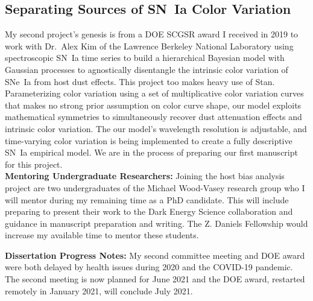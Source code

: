 \documentclass[modern]{aastex63}
\begin{document}
\subsection{Separating Sources of SN~Ia Color Variation}
My second project's genesis is from a DOE SCGSR award I received in 2019 to work with Dr.~Alex Kim of the Lawrence Berkeley National Laboratory using spectroscopic SN~Ia time series to build a hierarchical Bayesian model with Gaussian processes to agnostically disentangle the intrinsic color variation of SNe~Ia from host dust effects.
This project too makes heavy use of Stan.
Parameterizing color variation using a set of multiplicative color variation curves that makes no strong prior assumption on color curve shape, our model exploits mathematical symmetries to simultaneously recover dust attenuation effects and intrinsic color variation.
The our model's wavelength resolution is adjustable, and time-varying color variation is being implemented to create a fully descriptive SN~Ia empirical model.
We are in the process of preparing our first manuscript for this project.\\

{\bf Mentoring Undergraduate Researchers:}
Joining the host bias analysis project are two undergraduates of the Michael Wood-Vasey research group who I will mentor during my remaining time as a PhD candidate.  This will include preparing to present their work to the Dark Energy Science collaboration and guidance in manuscript preparation and writing.  The Z. Daniels Fellowship would increase my available time to mentor these students. 

{\bf Dissertation Progress Notes:}
My second committee meeting and DOE award were both delayed by health issues during 2020 and the COVID-19 pandemic. 
The second meeting is now planned for June 2021 and the DOE award, restarted remotely in January 2021, will conclude July 2021. 

\newpage


\end{document}
